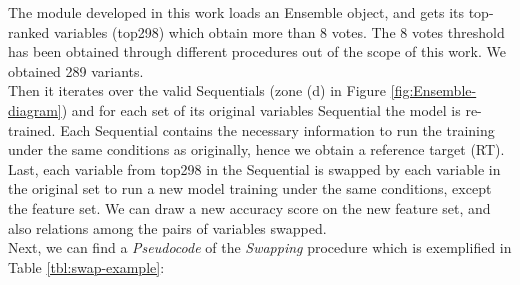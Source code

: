 The module developed in this work loads an Ensemble object, and gets its top-ranked variables (top298) which obtain more than 8 votes. The 8 votes threshold has been obtained through different procedures out of the scope of this work. We obtained 289 variants.
\\

Then it iterates over the valid Sequentials (zone (d) in Figure \ref{fig:Ensemble-diagram}) and for each set of its original variables Sequential the model is re-trained. Each Sequential contains the necessary information to run the training under the same conditions as originally, hence we obtain a reference target (RT). Last, each variable from top298 in the Sequential is swapped by each variable in the original set to run a new model training under the same conditions, except the feature set.
We can draw a new accuracy score on the new feature set, and also relations among the pairs of variables swapped.
\\

Next, we can find a \emph{Pseudocode} of the \emph{Swapping} procedure which is exemplified in Table \ref{tbl:swap-example}:


